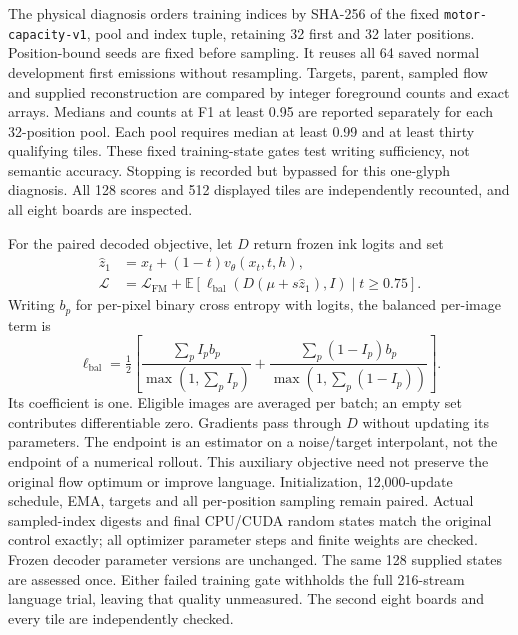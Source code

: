 \documentclass[12pt,a4paper]{article}
\providecommand{\DIFadd}[1]{{\protect\color{blue} \sf #1}} %
\begin{document}
\DIFadd{The physical diagnosis orders training indices by SHA-256 of the fixed
\texttt{motor-capacity-v1}, pool and index tuple, retaining 32 first and 32
later positions. Position-bound seeds are fixed before sampling. It reuses
all 64 saved normal development first emissions without resampling. Targets,
parent, sampled flow and supplied reconstruction are compared by integer
foreground counts and exact arrays. Medians and counts at F1 at least 0.95
are reported separately for each 32-position pool. Each pool requires median
at least 0.99 and at least thirty qualifying tiles. These fixed training-state
gates test writing sufficiency, not semantic accuracy. Stopping is recorded
but bypassed for this one-glyph diagnosis. All 128 scores and 512 displayed
tiles are independently recounted, and all eight boards are inspected.
}

\DIFadd{For the paired decoded objective, let $D$ return frozen ink logits and set
}\begin{align}
 \widehat z_1&=x_t+(1-t)v_\theta(x_t,t,h),\\
 \mathcal L&=\mathcal L_\mathrm{FM}+
 \mathbb E[\ell_\mathrm{bal}(D(\mu+s\widehat z_1),I)\mid t\geq0.75].
\end{align}
\DIFadd{Writing $b_p$ for per-pixel binary cross entropy with logits, the balanced
per-image term is
}\[
 \ell_\mathrm{bal}=\tfrac12\left[
 \frac{\sum_p I_pb_p}{\max(1,\sum_p I_p)}+
 \frac{\sum_p(1-I_p)b_p}{\max(1,\sum_p(1-I_p))}\right].
\]
\DIFadd{Its coefficient is one. Eligible images are averaged per batch; an empty set
contributes differentiable zero. Gradients pass through $D$ without updating
its parameters. The endpoint is an estimator on a noise/target interpolant,
not the endpoint of a numerical rollout. This auxiliary objective need not
preserve the original flow optimum or improve language. Initialization,
12,000-update schedule, EMA, targets and all per-position sampling remain
paired. Actual sampled-index digests and final CPU/CUDA random states match
the original control exactly; all optimizer parameter steps and finite
weights are checked. Frozen decoder parameter versions are unchanged.
The same 128 supplied states are assessed once. Either failed training gate
withholds the full 216-stream language trial, leaving that quality unmeasured.
The second eight boards and every tile are independently checked.
}
\end{document}
